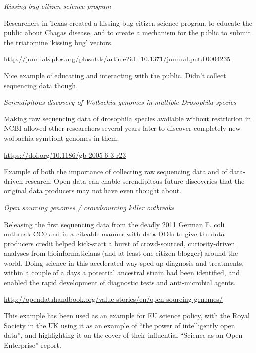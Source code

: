 \documentclass[]{article}
\begin{document}
\emph{Kissing bug citizen science program}

Researchers in Texas created a kissing bug citizen science program to educate the public about Chagas disease, and to create a mechanism for the public to submit the triatomine `kissing bug' vectors.

\url{http://journals.plos.org/plosntds/article?id=10.1371/journal.pntd.0004235}

Nice example of educating and interacting with the public. Didn't collect sequencing data though.

\emph{Serendipitous discovery of Wolbachia genomes in multiple Drosophila species}

Making raw sequencing data of drosophila species available without restriction in NCBI allowed other researchers several years later to discover completely new wolbachia symbiont genomes in them.

\url{https://doi.org/10.1186/gb-2005-6-3-r23}

Example of both the importance of collecting raw sequencing data and of data-driven research. Open data can enable serendipitous future discoveries that the original data producers may not have even thought about.

\emph{Open sourcing genomes / crowdsourcing killer outbreaks}

Releasing the first sequencing data from the deadly 2011 German E. coli outbreak CC0 and in a citeable manner with data DOIs to give the data producers credit helped kick-start a burst of crowd-sourced, curiosity-driven analyses from bioinformaticians (and at least one citizen blogger) around the world. Doing science in this accelerated way sped up diagnosis and treatments, within a couple of a days a potential ancestral strain had been identified, and enabled the rapid development of diagnostic tests and anti-microbial agents.

\url{http://opendatahandbook.org/value-stories/en/open-sourcing-genomes/}

This example has been used as an example for EU science policy, with the Royal Society in the UK using it as an example of ``the power of intelligently open data'', and highlighting it on the cover of their influential ``Science as an Open Enterprise'' report.


\end{document}
